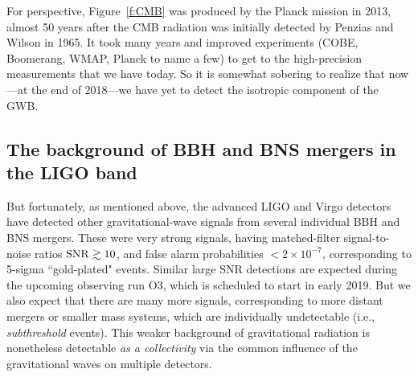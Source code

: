 \documentclass[11pt]{article}
\numberwithin{equation}{section}
\begin{document}
For perspective, Figure~\ref{f:CMB} was produced by 
the Planck mission in 2013,
almost 50 years after the CMB radiation was initially
detected by Penzias and Wilson in 1965.
It took many years and improved experiments
(COBE, Boomerang, WMAP, Planck to name a few) to get to 
the high-precision measurements that we have today.
So it is somewhat sobering to realize that now---at the 
end of 2018---we have yet to detect the isotropic component 
of the GWB.

\subsection{The background of BBH and BNS mergers in the 
LIGO band}

But fortunately, as mentioned above, the advanced LIGO
and Virgo detectors have detected other 
gravitational-wave signals from several individual BBH 
and BNS mergers.
These were very strong signals, having 
matched-filter signal-to-noise ratios ${\rm SNR}\gtrsim 10$, 
and false alarm probabilities $<2\times 10^{-7}$,
corresponding to 5-sigma ``gold-plated" events.
Similar large SNR detections are expected during the 
upcoming observing run O3, which is scheduled to start in early 2019.
But we also expect that there are many more signals, 
corresponding to more distant mergers or smaller mass systems, 
which are 
individually undetectable (i.e., {\em subthreshold} events).
This weaker background of gravitational radiation is 
nonetheless detectable {\em as a collectivity} via the common 
influence of the gravitational waves on multiple detectors.
\end{document}
